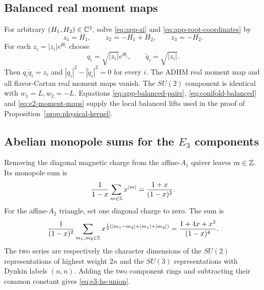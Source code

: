 \subsection{Balanced real moment maps}

For arbitrary $(H_1,H_2)\in\mathbb C^2$, solve
\eqref{eq:app-zi} and \eqref{eq:app-root-coordinates} by
\begin{equation}
 z_1=H_1,
 \qquad z_2=-H_1+H_2,
 \qquad z_3=-H_2.
\end{equation}
For each $z_i=|z_i|e^{\ii\theta_i}$ choose
\begin{equation}
 q_i=\sqrt{|z_i|}e^{\ii\theta_i},
 \qquad
 \widetilde q_i=\sqrt{|z_i|}.
 \label{eq:app-balanced-pairs}
\end{equation}
Then $q_i\widetilde q_i=z_i$ and
$|q_i|^2-|\widetilde q_i|^2=0$ for every $i$. The ADHM real moment map and all
flavor-Cartan real moment maps vanish. The $SU(2)$ component is identical with
$w_1=L,w_2=-L$. Equations \eqref{eq:app-balanced-pairs},
\eqref{eq:conifold-balanced} and \eqref{eq:e2-moment-maps} supply the local
balanced lifts used in the proof of Proposition~\ref{prop:physical-kernel}.

\subsection[Abelian monopole sums for the E3 components]{Abelian monopole sums for the $E_3$ components}

Removing the diagonal magnetic charge from the affine-$A_1$ quiver leaves
$m\in\mathbb Z$. Its monopole sum is
\begin{equation}
 \frac1{1-x}\sum_{m\in\mathbb Z}x^{|m|}
 =\frac{1+x}{(1-x)^2}.
\end{equation}
For the affine-$A_2$ triangle, set one diagonal charge to zero. The sum is
\begin{equation}
 \frac1{(1-x)^2}
 \sum_{m_1,m_2\in\mathbb Z}
 x^{\frac12(|m_1-m_2|+|m_1|+|m_2|)}
 =\frac{1+4x+x^2}{(1-x)^4}.
\end{equation}
The two series are respectively the character dimensions of the
$SU(2)$ representations of highest weight $2n$ and the $SU(3)$
representations with Dynkin labels $(n,n)$. Adding the two component rings and
subtracting their common constant gives \eqref{eq:e3-hs-union}.
